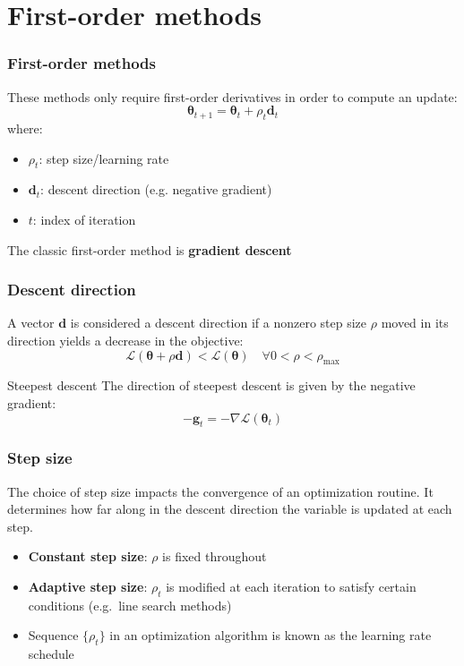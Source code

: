 \documentclass[smaller]{beamer}
\newcommand{\?}{\stackrel{?}{=}}
\renewcommand{\th}{\theta}
\newcommand{\mc}{\mathcal}
\newcommand{\pe}{\pause}
\begin{document}
\section{First-order methods}

\begin{frame}
  \frametitle{First-order methods}
  \pause

  These methods only require first-order derivatives in order to compute an update: \pause
  \begin{equation}
    \bm\th_{t+1} = \bm\th_{t} + \rho_{t}\bm d_{t}
  \end{equation}
  \pause
  where:\pause
  \begin{itemize}
  \item $\rho_{t}$: step size/learning rate \pe
  \item $\bm d_{t}$: descent direction (e.g. negative gradient)\pe
  \item $t$: index of iteration
  \end{itemize}
  \pe
  The classic first-order method is \textbf{gradient descent}

\end{frame}


\begin{frame}
  \frametitle{Descent direction}
  \pe
  A vector $\bm d$ is considered a descent direction if a nonzero step size $\rho$ moved in its direction  yields a decrease in the objective: \pe
  \begin{equation}
    \mc{L}(\bm\th +\rho\bm d) < \mc{L}(\bm\th) \quad \forall 0 < \rho <\rho_{\max}
  \end{equation}

  \pause
  \begin{block}{Steepest descent}
    \pe
    The direction of steepest descent is given by the negative gradient: \pe
    \begin{equation}
      -\bm g_{t} = -\nabla\mc{L}(\bm\th_{t})
    \end{equation}
    \pause
    
  \end{block}
\end{frame}

\begin{frame}
  \frametitle{Step size}
  \pe The choice of step size impacts the convergence of an optimization routine. It determines how far along in the
  descent direction the variable is updated at each step.
  \pause
  \begin{itemize}
  \item \textbf{Constant step size}: $\rho$ is fixed throughout\pe
  \item \textbf{Adaptive step size}: $\rho_{t}$ is modified at each iteration to satisfy certain conditions (e.g.\ line search methods)\pe
\item Sequence $\{\rho_{t}\}$ in an optimization algorithm is known as the learning rate schedule
  \end{itemize}
\end{frame}
\end{document}

